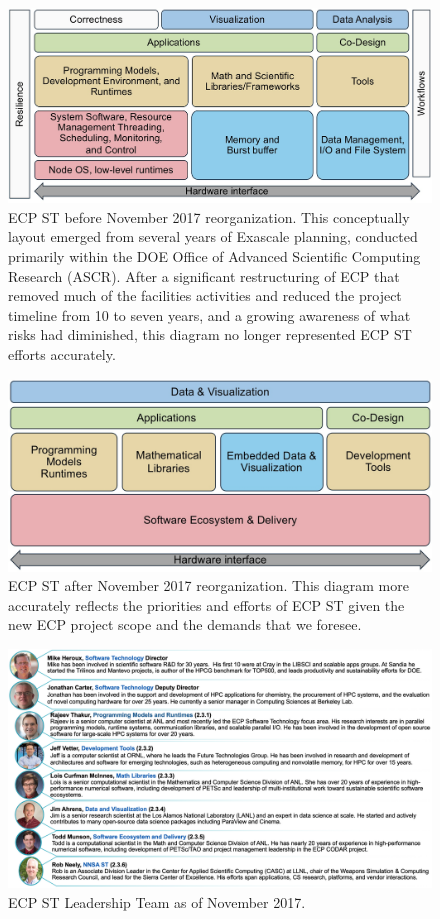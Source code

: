 \begin{figure}
	\centering
	\includegraphics[width=0.9\linewidth]{ECPSTV1}
	\caption{ECP ST before November 2017 reorganization.  This conceptually layout emerged from several years of Exascale planning, conducted primarily within the DOE Office of Advanced Scientific Computing Research (ASCR).  After a significant restructuring of ECP that removed much of the facilities activities and reduced the project timeline from 10 to seven years, and a growing awareness of what risks had diminished, this diagram no longer represented ECP ST efforts accurately.}
	\label{fig:ecpstv1}
\end{figure}
\begin{figure}
	\centering
	\includegraphics[width=0.9\linewidth]{ECPSTV2}
	\caption{ECP ST after November 2017 reorganization.  This diagram more accurately reflects the priorities and efforts of ECP ST given the new ECP project scope and the demands that we foresee.}
	\label{fig:ecpstv2}
\end{figure}
\begin{figure}
	\centering
	\includegraphics[width=0.9\linewidth]{ECP-ST-Leads}
	\caption{ECP ST Leadership Team as of November 2017.}
	\label{fig:ecpstleads}
\end{figure}


